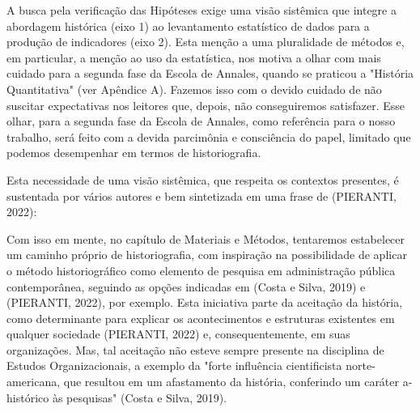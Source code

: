 \noindent\begin{center}\mbox{\centering{}}\end{center}


A busca pela verificação das Hipóteses exige uma visão sistêmica que integre a abordagem histórica (eixo 1) ao levantamento estatístico de dados para a produção de indicadores (eixo 2). Esta menção a uma pluralidade de métodos e, em particular, a menção ao uso da estatística, nos motiva a olhar com mais cuidado para a segunda fase da Escola de Annales, quando se praticou a "História Quantitativa" (ver Apêndice A). Fazemos isso com o devido cuidado de não suscitar expectativas nos leitores que, depois, não conseguiremos satisfazer. Esse olhar, para a segunda fase da Escola de Annales, como referência para o nosso trabalho, será feito com a devida parcimônia e consciência do papel, limitado que podemos desempenhar em termos de historiografia.

Esta necessidade de uma visão sistêmica, que respeita os contextos presentes, é sustentada por vários autores e bem sintetizada em uma frase de (PIERANTI, 2022):


\noindent\begin{center}\mbox{\centering{}}\end{center}


Com isso em mente, no capítulo de Materiais e Métodos, tentaremos estabelecer um caminho próprio de historiografia, com inspiração na possibilidade de aplicar o método historiográfico como elemento de pesquisa em administração pública contemporânea, seguindo as opções indicadas em  (Costa e Silva, 2019) e (PIERANTI, 2022), por exemplo. Esta iniciativa parte da aceitação da história, como determinante para explicar os acontecimentos e estruturas existentes em qualquer sociedade (PIERANTI, 2022) e, consequentemente, em suas organizações. Mas, tal aceitação não esteve sempre presente na disciplina de Estudos Organizacionais, a exemplo da "forte influência cientificista norte-americana, que resultou em um afastamento da história, conferindo um caráter a-histórico às pesquisas" (Costa e Silva, 2019).

